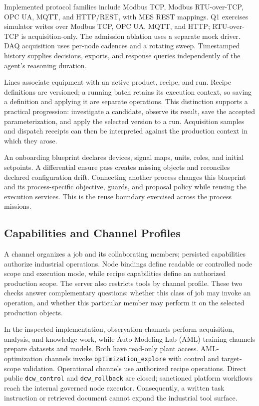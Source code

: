 Implemented protocol families include Modbus TCP, Modbus RTU-over-TCP,
OPC UA, MQTT, and HTTP/REST, with MES REST mappings. Q1 exercises simulator
writes over Modbus TCP, OPC UA, MQTT, and HTTP; RTU-over-TCP is
acquisition-only. The admission ablation uses a separate mock driver.
DAQ acquisition uses per-node cadences and a rotating sweep. Timestamped
history supplies decisions, exports, and response queries independently of
the agent's reasoning duration.

Lines associate equipment with an active product, recipe, and run. Recipe
definitions are versioned; a running batch retains its execution context,
so saving a definition and applying it are separate operations. This
distinction supports a practical progression: investigate a candidate,
observe its result, save the accepted parameterization, and apply the
selected version to a run. Acquisition samples and dispatch receipts can
then be interpreted against the production context in which they arose.

An onboarding blueprint declares devices, signal maps, units, roles, and
initial setpoints. A differential ensure pass creates missing objects and
reconciles declared configuration drift. Connecting another process changes
this blueprint and its process-specific objective, guards, and proposal
policy while reusing the execution services. This is the reuse boundary
exercised across the process missions.
\label{sec:reuse}

\subsection{Capabilities and Channel Profiles}
A channel organizes a job and its collaborating members; persisted
capabilities authorize industrial operations. Node bindings define readable
or controlled node scope and execution mode, while recipe capabilities
define an authorized production scope. The server also restricts tools by
channel profile. These two checks answer complementary questions: whether
this class of job may invoke an operation, and whether this particular
member may perform it on the selected production objects.

In the inspected implementation, observation channels perform
acquisition, analysis, and knowledge work, while Auto Modeling Lab (AML)
training channels prepare datasets and models. Both have read-only plant
access. AML-optimization channels invoke \texttt{optimization\_explore}
with control and target-scope validation. Operational channels use
authorized recipe operations. Direct public \texttt{dcw\_control} and
\texttt{dcw\_rollback} are closed; sanctioned platform workflows reach the
internal governed node executor. Consequently, a written task instruction
or retrieved document cannot expand the industrial tool surface.

